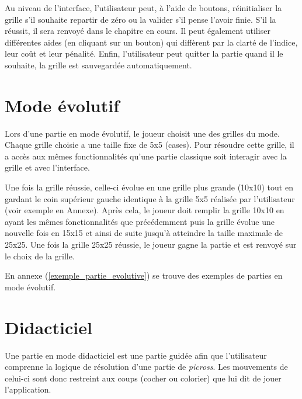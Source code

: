 \documentclass{report}
\begin{document}
		Au niveau de l'interface, l'utilisateur peut, à l'aide de boutons, réinitialiser la grille s'il souhaite repartir de zéro ou la valider s'il pense l'avoir finie. S'il la réussit, il sera renvoyé dans le chapitre en cours. Il peut également utiliser différentes aides (en cliquant sur un bouton) qui diffèrent par la clarté de l'indice, leur coût et leur pénalité. Enfin, l'utilisateur peut quitter la partie quand il le souhaite, la grille est sauvegardée automatiquement.
	
	\section{Mode évolutif}
	Lors d'une partie en mode évolutif, le joueur choisit une des grilles du mode. Chaque grille choisie a une taille fixe de 5x5 (cases). Pour résoudre cette grille, il a accès aux mêmes fonctionnalités qu'une partie classique soit interagir avec la grille et avec l'interface.
	
    Une fois la grille réussie, celle-ci évolue en une grille plus grande (10x10) tout en gardant le coin supérieur gauche identique à la grille 5x5 réalisée par l'utilisateur (voir exemple en Annexe). Après cela, le joueur doit remplir la grille 10x10 en ayant les mêmes fonctionnalités que précédemment puis la grille évolue une nouvelle fois en 15x15 et ainsi de suite jusqu'à atteindre la taille maximale de 25x25. Une fois la grille 25x25 réussie, le joueur gagne la partie et est renvoyé sur le choix de la grille.
    
    En annexe (\ref{exemple_partie_evolutive}) se trouve des exemples de parties en mode évolutif.
	
	
	\section{Didacticiel}
	
	Une partie en mode didacticiel est une partie guidée afin que l'utilisateur comprenne la logique de résolution d'une partie de \textit{picross}. Les mouvements de celui-ci sont donc restreint aux coups (cocher ou colorier) que lui dit de jouer l'application.
	
\end{document}
